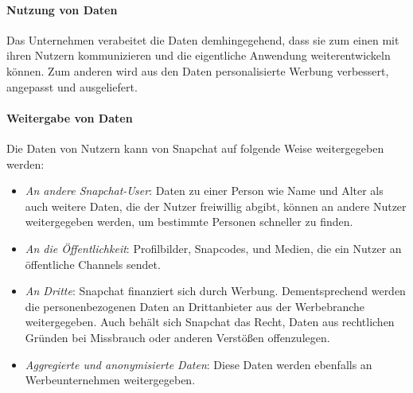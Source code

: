 \paragraph{Nutzung von Daten}
Das Unternehmen verabeitet die Daten demhingegehend, dass sie zum einen mit
ihren Nutzern kommunizieren und die eigentliche Anwendung weiterentwickeln
k\"onnen. Zum anderen wird aus den Daten personalisierte Werbung verbessert,
angepasst und ausgeliefert.

\paragraph{Weitergabe von Daten}
Die Daten von Nutzern kann von Snapchat auf folgende Weise weitergegeben werden:
\begin{itemize}
	\item \emph{An andere Snapchat-User}: Daten zu einer Person wie Name und
		Alter als auch weitere Daten, die der Nutzer freiwillig abgibt,
		k\"onnen an andere Nutzer weitergegeben werden, um bestimmte Personen
		schneller zu finden.
	\item \emph{An die \"Offentlichkeit}: Profilbilder, Snapcodes, und Medien,
		die ein Nutzer an \"offentliche Channels sendet.
	\item \emph{An Dritte}: Snapchat finanziert sich durch Werbung.
		Dementsprechend werden die personenbezogenen Daten an Drittanbieter aus
		der Werbebranche weitergegeben. Auch beh\"alt sich Snapchat das Recht,
		Daten aus rechtlichen Gr\"unden bei Missbrauch oder anderen
		Verst\"o{\ss}en offenzulegen.
	\item \emph{Aggregierte und anonymisierte Daten}: Diese Daten werden
		ebenfalls an Werbeunternehmen weitergegeben.
\end{itemize}

